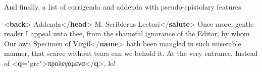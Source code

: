And finally, a list of corrigenda and addenda with pseudo-epistolary features: \par\bgroup{}\exampleFont \begin{shaded}\noindent\mbox{}{<\textbf{back}>}\mbox{}\newline 
{}\mbox{}\newline 
\hspace*{1em}Addenda{</\textbf{head}>}\mbox{}\newline 
\hspace*{1em}M. Scriblerus Lectori{</\textbf{salute}>}\mbox{}\newline 
\hspace*{1em}Once more, gentle reader I appeal unto thee, from the shameful\mbox{}\newline 
\hspace*{1em}\hspace*{1em}\hspace*{1em}\hspace*{1em} ignorance of the Editor, by whom Our own Specimen of\mbox{}\newline 
\hspace*{1em}Virgil{</\textbf{name}>} hath been mangled in such miserable manner, that\mbox{}\newline 
\hspace*{1em}\hspace*{1em}\hspace*{1em}\hspace*{1em} scarce without tears can we behold it. At the very entrance, Instead\mbox{}\newline 
\hspace*{1em}\hspace*{1em}\hspace*{1em}\hspace*{1em} of {<\textbf{q}\hspace*{1em}{xml:lang}="{grc}">}προλεγομενα{</\textbf{q}>}, lo!\mbox{}\newline 

\end{shaded}
